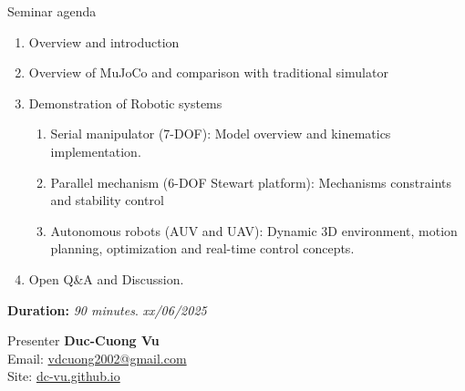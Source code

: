 \documentclass[11pt,a4paper]{article}
\begin{document}
	\begin{gradientbox}{Seminar agenda}
		\begin{enumerate}[itemsep=1pt]
			\item Overview and introduction
			\item Overview of MuJoCo and comparison with traditional simulator
			\item Demonstration of Robotic systems
			\begin{enumerate}[topsep=-1pt]
				\item Serial manipulator (7-DOF): Model overview and kinematics implementation.
				\item Parallel mechanism (6-DOF Stewart platform): Mechanisms constraints and stability control
				\item Autonomous robots (AUV and UAV): Dynamic 3D environment, motion planning, optimization and real-time control concepts.
			\end{enumerate}
			\item Open Q\&A and Discussion.
		\end{enumerate}
		\textbf{Duration:} \textit{90 minutes}. \textit{xx/06/2025}
	\end{gradientbox}


	\begin{gradientbox}{Presenter}
		\textbf{Duc-Cuong Vu}\\
		Email: \href{mailto:vdcuong2002@gmail.com}{vdcuong2002@gmail.com} \\
		Site: \href{https://dc-vu.github.io}{dc-vu.github.io}
	\end{gradientbox}
	
	
\end{document}

